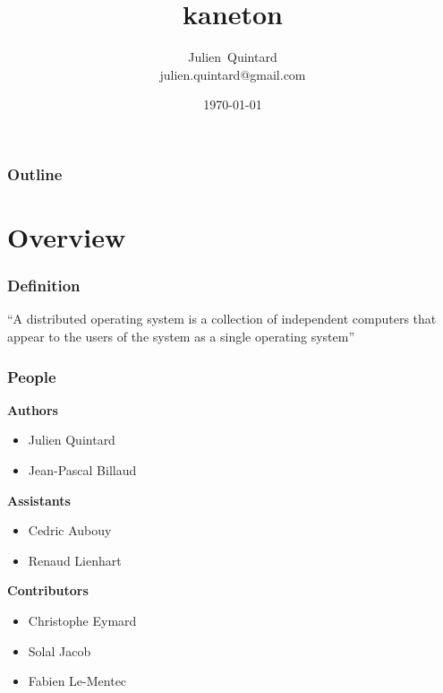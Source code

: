 \documentclass[8pt]{beamer}
\title{kaneton}
\author
{
  Julien~Quintard\inst{1} \\
  {\tiny julien.quintard@gmail.com}
}
\institute
{
  \inst{1} kaneton distributed operating system project
}
\date{\today}
\newcommand{\nl}[0]{\vspace{0.4cm}}
\begin{document}
%
%

\begin{frame}
  \titlepage

  \begin{center}
     \hspace{0.1cm}  \hspace{0.1cm}
     \hspace{0.1cm}
  \end{center}
\end{frame}

%
%

\begin{frame}
  \frametitle{Outline}
  \tableofcontents
\end{frame}

%
%

\section{Overview}


\begin{frame}
  \frametitle{Definition}

  ``A distributed operating system is a collection of independent
  computers that appear to the users of the system as a single operating
  system''
\end{frame}


\begin{frame}
  \frametitle{People}

  \textbf{Authors}

  \begin{itemize}
    \item
      Julien Quintard
    \item
      Jean-Pascal Billaud
  \end{itemize}

  \nl

  \textbf{Assistants}

  \begin{itemize}
    \item
      Cedric Aubouy
    \item
      Renaud Lienhart
  \end{itemize}

  \nl

  \textbf{Contributors}

  \begin{itemize}
    \item
      Christophe Eymard
    \item
      Solal Jacob
    \item
      Fabien Le-Mentec
  \end{itemize}
\end{frame}
\end{document}
